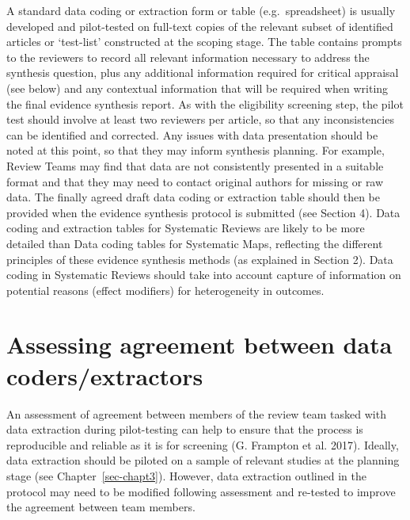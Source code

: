 \documentclass[
  letterpaper,
  DIV=11,
  numbers=noendperiod]{scrreprt}
\begin{document}
A standard data coding or extraction form or table (e.g.~spreadsheet) is
usually developed and pilot-tested on full-text copies of the relevant
subset of identified articles or `test-list' constructed at the scoping
stage. The table contains prompts to the reviewers to record all
relevant information necessary to address the synthesis question, plus
any additional information required for critical appraisal (see below)
and any contextual information that will be required when writing the
final evidence synthesis report. As with the eligibility screening step,
the pilot test should involve at least two reviewers per article, so
that any inconsistencies can be identified and corrected. Any issues
with data presentation should be noted at this point, so that they may
inform synthesis planning. For example, Review Teams may find that data
are not consistently presented in a suitable format and that they may
need to contact original authors for missing or raw data. The finally
agreed draft data coding or extraction table should then be provided
when the evidence synthesis protocol is submitted (see Section 4). Data
coding and extraction tables for Systematic Reviews are likely to be
more detailed than Data coding tables for Systematic Maps, reflecting
the different principles of these evidence synthesis methods (as
explained in Section 2). Data coding in Systematic Reviews should take
into account capture of information on potential reasons (effect
modifiers) for heterogeneity in outcomes.

\section{Assessing agreement between data
coders/extractors}\label{assessing-agreement-between-data-codersextractors}

An assessment of agreement between members of the review team tasked
with data extraction during pilot-testing can help to ensure that the
process is reproducible and reliable as it is for screening (G. Frampton
et al. 2017). Ideally, data extraction should be piloted on a sample of
relevant studies at the planning stage (see Chapter~\ref{sec-chapt3}).
However, data extraction outlined in the protocol may need to be
modified following assessment and re-tested to improve the agreement
between team members.
\end{document}

